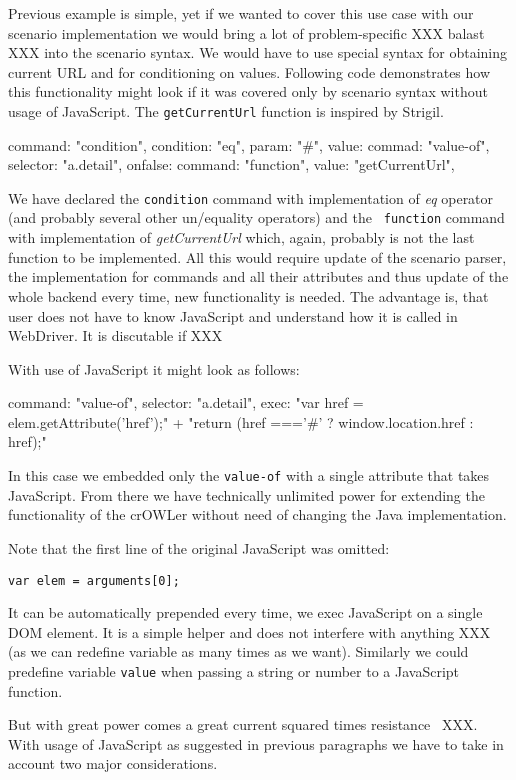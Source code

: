 Previous example is simple, yet if we wanted to cover this use case with our
scenario implementation we would bring a lot of problem-specific XXX balast XXX
into the scenario syntax. We would have to use special syntax for obtaining
current URL and for conditioning on values. Following code demonstrates how this 
functionality might look if it was covered only by scenario syntax without usage
of JavaScript. The {\tt getCurrentUrl} function is inspired by Strigil. 

\begtt
{
  command: "condition", 
  condition: "eq", 
  param: "#", 
  value: {
    commad: "value-of", 
    selector: "a.detail", 
  }
  onfalse: {
    command: "function", 
    value: "getCurrentUrl", 
  }
}
\endtt

We have declared the {\tt condition} command with implementation of {\em eq}
operator (and probably several other un/equality operators) and the {\tt
function} command with implementation of {\em getCurrentUrl} which, again,
probably is not the last function to be implemented. All this would require
update of the scenario parser, the implementation for commands and all their
attributes and thus update of the whole backend every time, new functionality is
needed. The advantage is, that user does not have to know JavaScript and
understand how it is called in WebDriver. It is discutable if XXX

With use of JavaScript it might look as follows: 

\begtt
{
  command: "value-of", 
  selector: "a.detail", 
  exec: "var href = elem.getAttribute('href');" +
        "return (href ==='#' ? window.location.href : href);"
}
\endtt

In this case we embedded only the {\tt value-of} with a single attribute that
takes JavaScript. From there we have technically unlimited power for extending
the functionality of the crOWLer without need of changing the Java
implementation. 

Note that the first line of the original JavaScript was omitted: 

{\tt var elem = arguments[0];} 

It can be automatically prepended every time, we exec JavaScript on a single
DOM element. It is a simple helper and does not interfere with anything XXX (as
we can redefine variable as many times as we want). Similarly we could
predefine variable {\tt value} when passing a string or number to a JavaScript
function. 

But with great power comes a great current squared times
resistance~ XXX. With usage of JavaScript as
suggested in previous paragraphs we have to take in account two major
considerations. 

